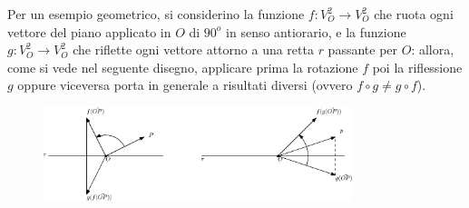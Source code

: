 Per un esempio geometrico, si considerino la funzione $f:V_O^2\to V_O^2$ che ruota ogni vettore
del piano applicato in $O$ di $90^o$ in senso antiorario, e la funzione $g:V_O^2\to V_O^2$ che
riflette ogni vettore attorno a una retta $r$ passante per $O$: allora, come si vede nel seguente
disegno, applicare prima la rotazione $f$ poi la riflessione $g$ oppure viceversa porta in
generale a risultati diversi (ovvero $f\circ g \neq g\circ f$).
\begin{figure}[ht]
  \centering
  \includegraphics[width=9cm]{img/finiti/imgex4-5-4.eps}
\end{figure}

